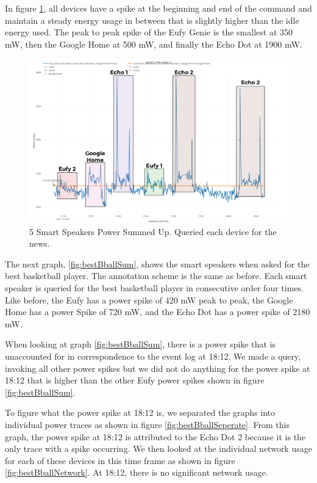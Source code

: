 In figure \ref{fig:mixedNewsSum}, all devices have a spike at the beginning and end of the command and maintain a steady energy usage in between that is slightly higher than the idle energy used. The peak to peak spike of the Eufy Genie is the smallest at 350 mW, then the Google Home at 500 mW, and finally the Echo Dot at 1900 mW.

\begin{figure}[H]
  \centering
  \includegraphics[width=1\textwidth]{figures/mixedNewsSum.png}
  \caption{5 Smart Speakers Power Summed Up. Queried each device for the
  news.}
  \label{fig:mixedNewsSum}
\end{figure}

The next graph, \ref{fig:bestBballSum}, shows the smart speakers when asked for the best basketball player. The annotation scheme is the same as before. Each smart speaker is queried for the best basketball player in consecutive order four times. Like before, the Eufy has a power spike of 420 mW peak to peak, the Google Home has a power Spike of 720 mW, and the Echo Dot has a power spike of 2180 mW.

When looking at graph \ref{fig:bestBballSum}, there is a power spike that is unaccounted for in correspondence to the event log at 18:12. We made a query, invoking all other power spikes but we did not do anything for the power spike at 18:12 that is higher than the other Eufy power spikes shown in figure \ref{fig:bestBballSum}.

To figure what the power spike at 18:12 is, we separated the graphs into individual power traces as shown in figure \ref{fig:bestBballSeperate}. From this graph, the power spike at 18:12 is attributed to the Echo Dot 2 because it is the only trace with a spike occurring. We then looked at the individual network usage for each of these devices in this time frame as shown in figure \ref{fig:bestBballNetwork}. At 18:12, there is no significant network usage.

